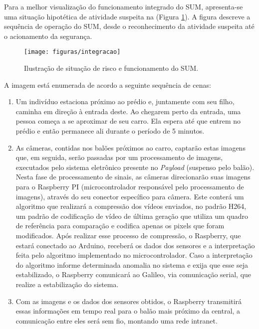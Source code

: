 Para a melhor visualização do funcionamento integrado do SUM, apresenta-se uma situação hipotética de atividade suspeita na (Figura \ref{img:integracao}). A figura descreve a sequência de operação do SUM, desde o reconhecimento da atividade suspeita até o acionamento da segurança.

\begin{figure}[H]
	\centering
	\caption{Ilustração de situação de risco e funcionamento do SUM.}
	\texttt{[image: figuras/integracao]}
	\label{img:integracao}
\end{figure}

A imagem está enumerada de acordo a seguinte sequência de cenas:

\begin{enumerate}
	\item Um indivíduo estaciona próximo ao prédio e, juntamente com seu filho, caminha em direção à entrada deste. Ao chegarem perto da entrada, uma pessoa começa a se aproximar de seu carro. Ela espera até que entrem no prédio e então permanece ali durante o período de 5 minutos.

	\item As câmeras, contidas nos balões próximos ao carro, captarão estas imagens que, em seguida, serão passadas por um processamento de imagens, executados pelo sistema eletrônico presente no \textit{Payload} (suspenso pelo balão). Nesta fase de processamento de sinais, as câmeras direcionarão suas imagens para o Raspberry PI (microcontrolador responsável pelo processamento de imagens), através do seu conector específico para câmera.
	Este conterá um algoritmo que realizará a compressão dos vídeos enviados, no padrão H264, um padrão de codificação de vídeo de última geração que utiliza um quadro de referência para comparação e codifica apenas os pixels que foram modificados. Após realizar esse processo de compressão, o Raspberry, que estará conectado ao Arduino, receberá os dados dos sensores e a interpretação feita pelo algoritmo implementado no microcontrolador. Caso a interpretação do algoritmo informe determinada anomalia no sistema e exija que esse seja estabilizado, o Raspberry comunicará ao Galileo, via comunicação serial, que realize a estabilização do sistema.

	\item Com as imagens e os dados dos sensores obtidos, o Raspberry transmitirá essas informações em tempo real para o balão mais próximo da central, a comunicação entre eles será sem fio, montando uma rede intranet.


\end{enumerate}
